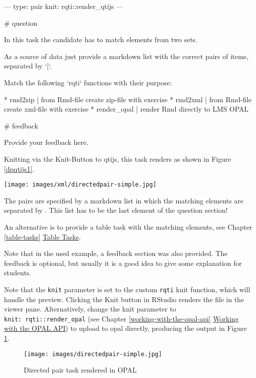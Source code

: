 \documentclass[twoside]{tufte-book}
\newenvironment{Shaded}{}{}
\begin{document}
\begin{Shaded}
\begin{Highlighting}
---
type: pair
knit: rqti::render_qtijs
---

# question

In this task the candidate has to match elements from two sets.

As a source of data just provide a markdown list with the correct pairs of
items, separated by `|`.

Match the following `rqti` functions with their purpose:

* rmd2zip | from Rmd-file create zip-file with exercise
* rmd2xml | from Rmd-file create xml-file with exercise
* render_opal | render Rmd directly to LMS OPAL

# feedback

Provide your feedback here.
\end{Highlighting}
\end{Shaded}

Knitting via the Knit-Button to qtijs, this task renders as shown in Figure \ref{dpqtijs1}.

\begin{figure*}
\centering
\texttt{[image: images/xml/directedpair-simple.jpg]}
\caption{\label{dpqtijs1}Directed pair task rendered with qtijs}
\end{figure*}

The pairs are specified by a markdown list in which the matching elements are separated by \texttt{\textbar{}}. This list has to be the last element of the question section!

An alternative is to provide a table task with the matching elements, see Chapter \ref{table-tasks} \href{table.html}{Table Tasks}.

Note that in the used example, a feedback section was also provided. The feedback is optional, but usually it is a good idea to give some explanation for students.

Note that the \texttt{knit} parameter is set to the custom \texttt{rqti} knit function,
which will handle the preview. Clicking the Knit button in RStudio renders the file in the viewer pane. \noindent Alternatively, change the knit parameter to \texttt{knit:\ rqti::render\_opal} (see Chapter \ref{working-with-the-opal-api} \href{api_opal.html}{Working with the OPAL API}) to upload to opal directly, producing the output in Figure \ref{dpopal1}.

\begin{figure}
\centering
\texttt{[image: images/directedpair-simple.jpg]}
\caption{\label{dpopal1}Directed pair task rendered in OPAL}
\end{figure}
\end{document}
